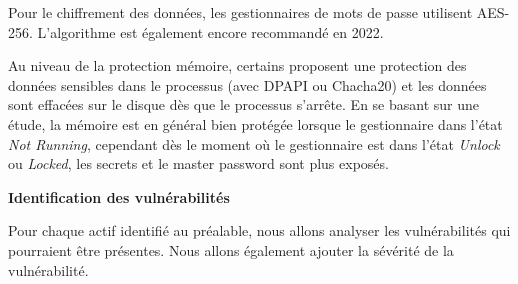 Pour le chiffrement des données, les gestionnaires de mots de passe utilisent AES-256. L'algorithme est également encore recommandé en 2022.

Au niveau de la protection mémoire, certains proposent une protection des données sensibles dans le processus (avec DPAPI ou Chacha20) et les données sont effacées sur le disque dès que le processus s'arrête. En se basant sur une étude\cite{iseexploit}, la mémoire est en général bien protégée lorsque le gestionnaire dans l'état \textit{Not Running}, cependant dès le moment où le gestionnaire est dans l'état \textit{Unlock} ou \textit{Locked}, les secrets et le master password sont plus exposés. 

\textbf{Identification des vulnérabilités}

Pour chaque actif identifié au préalable, nous allons analyser les vulnérabilités qui pourraient être présentes. Nous allons également ajouter la sévérité de la vulnérabilité. 

\begin{table}[H]
	\centering
	\caption{Vulnérabilités présentes dans les gestionnaires de mots de passe M5}
\end{table}

